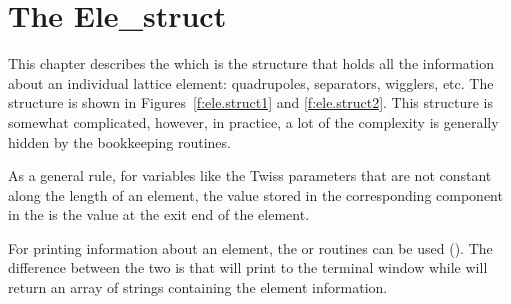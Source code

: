 \chapter{The Ele_struct}
\label{c:ele.struct}

This chapter describes the  which is the structure that
holds all the information about an individual lattice element:
quadrupoles, separators, wigglers, etc. The  structure is
shown in Figures~\ref{f:ele.struct1}  and \ref{f:ele.struct2}. This
structure is somewhat complicated, however, in practice, a lot of the
complexity is generally hidden  by the \bmad bookkeeping routines.

As a general rule, for variables like the Twiss parameters that are not
constant along the length of an element, the value stored in the
corresponding component in the  is the value at the exit
end of the element.

For printing information about an element, the
 or  routines
can be used (). The difference between the two is
that  will print to the terminal window while 
will return an array of strings containing the element information.

